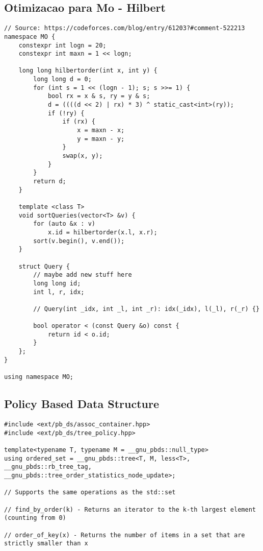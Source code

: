 \documentclass[12pt, a4paper, twoside]{article}
\begin{document}
\subsection{Otimizacao para Mo - Hilbert
}
\begin{lstlisting}
// Source: https://codeforces.com/blog/entry/61203?#comment-522213
namespace MO {
	constexpr int logn = 20;
	constexpr int maxn = 1 << logn;

	long long hilbertorder(int x, int y) {
		long long d = 0;
		for (int s = 1 << (logn - 1); s; s >>= 1) {
			bool rx = x & s, ry = y & s;
			d = ((((d << 2) | rx) * 3) ^ static_cast<int>(ry));
			if (!ry) {
				if (rx) {
					x = maxn - x;
					y = maxn - y;
				}
				swap(x, y);
			}
		}
		return d;
	}

	template <class T>
	void sortQueries(vector<T> &v) {
		for (auto &x : v)
			x.id = hilbertorder(x.l, x.r);
		sort(v.begin(), v.end());
	}

	struct Query {
		// maybe add new stuff here
		long long id;
		int l, r, idx;

		// Query(int _idx, int _l, int _r): idx(_idx), l(_l), r(_r) {}

		bool operator < (const Query &o) const {
			return id < o.id;
		}
	};
}

using namespace MO;
\end{lstlisting}

\subsection{Policy Based Data Structure
}
\begin{lstlisting}
#include <ext/pb_ds/assoc_container.hpp>
#include <ext/pb_ds/tree_policy.hpp>

template<typename T, typename M = __gnu_pbds::null_type>
using ordered_set = __gnu_pbds::tree<T, M, less<T>, __gnu_pbds::rb_tree_tag, __gnu_pbds::tree_order_statistics_node_update>;

// Supports the same operations as the std::set

// find_by_order(k) - Returns an iterator to the k-th largest element (counting from 0)

// order_of_key(x) - Returns the number of items in a set that are strictly smaller than x
\end{lstlisting}
\end{document}
